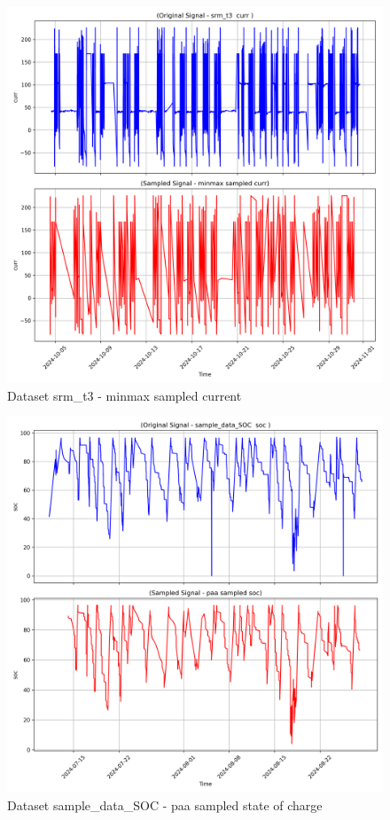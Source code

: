 \begin{figure}
    \centering
    \includegraphics[width=1\linewidth]{screenshots/srm_t3/minmax_sampled_curr_screenshot.png}
    \caption{Dataset srm\_t3 - minmax sampled current }
    \label{fig:srm_t3_minmax_sampled_curr_screenshot}
\end{figure}
\begin{figure}
    \centering
    \includegraphics[width=1\linewidth]{screenshots/sample_data_SOC/paa_sampled_soc_screenshot.png}
    \caption{Dataset sample\_data\_SOC - paa sampled state of charge }
    \label{fig:sample_data_SOC_paa_sampled_soc_screenshot}
\end{figure}
